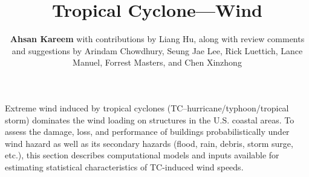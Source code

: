 %
%
%


%
%
%
%
%
%
%
%

\title{Tropical Cyclone---Wind}
\author{
    \textbf{Ahsan Kareem}
    with contributions by Liang Hu,
    \newline
    along with review comments and suggestions by Arindam Chowdhury, Seung Jae Lee, Rick Luettich, Lance Manuel, Forrest Masters, and Chen Xinzhong
}
\tocauthor{}
%
%
\maketitle

Extreme wind induced by tropical cyclones (TC--hurricane/typhoon/tropical storm) dominates the wind loading on structures in the U.S. coastal areas. To assess the damage, loss, and performance of buildings probabilistically under wind hazard as well as its secondary hazards (flood, rain, debris, storm surge, etc.), this section describes computational models and inputs available for estimating statistical characteristics of TC-induced wind speeds. 

